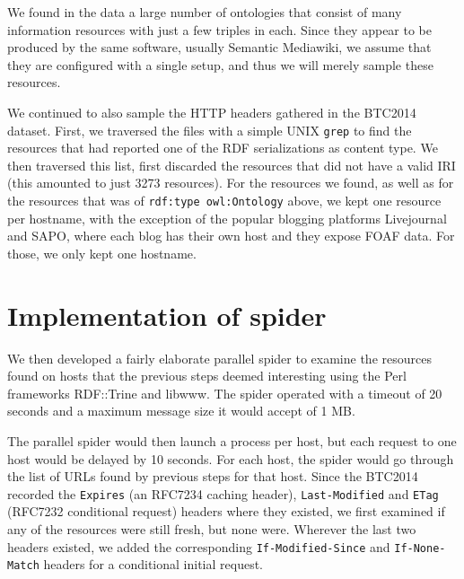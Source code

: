 \documentclass{article}
\newcommand{\rdfterm}[1]{\texttt{#1}}
\newcommand{\httph}[1]{\texttt{#1}}
\begin{document}
\begin{appendices}
We found in the data a large number of ontologies that consist of many
information resources with just a few triples in each. Since they
appear to be produced by the same software, usually Semantic
Mediawiki, we assume that they are configured with a single setup, and
thus we will merely sample these resources.

We continued to also sample the HTTP headers gathered in the BTC2014
dataset. 
First, we traversed the files with a simple UNIX \texttt{grep} to find
the resources that had reported one of the RDF serializations as
content type. We then traversed this list, first discarded the
resources that did not have a valid IRI (this amounted to just 3273
resources). For the resources we found, as well as for the resources
that was of \rdfterm{rdf:type owl:Ontology} above, we kept one
resource per hostname, with the exception of the popular blogging
platforms Livejournal and SAPO, where each blog has their own host and
they expose FOAF data. For those, we only kept one hostname. 

\section{Implementation of spider}\label{app:fetcher}

We then developed a fairly elaborate parallel spider to examine the
resources found on hosts that the previous steps deemed interesting
using the Perl frameworks RDF::Trine and libwww. The spider operated
with a timeout of 20 seconds and a maximum message size it would
accept of 1 MB.

The parallel spider would then launch a process per host, but each
request to one host would be delayed by 10 seconds. For each host, the
spider would go through the list of URLs found by previous steps for
that host. Since the BTC2014 recorded
the \httph{Expires} (an RFC7234 caching header), \httph{Last-Modified}
and \httph{ETag} (RFC7232 conditional request) headers where they
existed, we first examined if any of the resources were still fresh,
but none were. Wherever the last two headers existed, we added the
corresponding \httph{If-Modified-Since} and \httph{If-None-Match}
headers for a conditional initial request.


\end{appendices}
\end{document}
